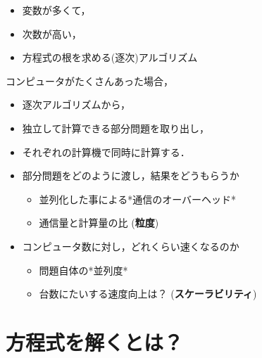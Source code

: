 \documentclass[a4j]{jarticle}
\author{Masayuki Suzuki}
\date{\today}
\title{}
\begin{document}
\tableofcontents

\begin{itemize}
\item 変数が多くて，

\item 次数が高い，

\item 方程式の根を求める(逐次)アルゴリズム
\end{itemize}

コンピュータがたくさんあった場合，

\begin{itemize}
\item 逐次アルゴリズムから，

\item 独立して計算できる部分問題を取り出し，

\item それぞれの計算機で同時に計算する．

\item 部分問題をどのように渡し，結果をどうもらうか

\begin{itemize}
\item 並列化した事による*通信のオーバーヘッド*

\item 通信量と計算量の比 (\textbf{粒度})
\end{itemize}

\item コンピュータ数に対し，どれくらい速くなるのか

\begin{itemize}
\item 問題自体の*並列度*

\item 台数にたいする速度向上は？ (\textbf{スケーラビリティ})
\end{itemize}
\end{itemize}

\section{方程式を解くとは？}
\label{sec:orge98fe38}
\end{document}
